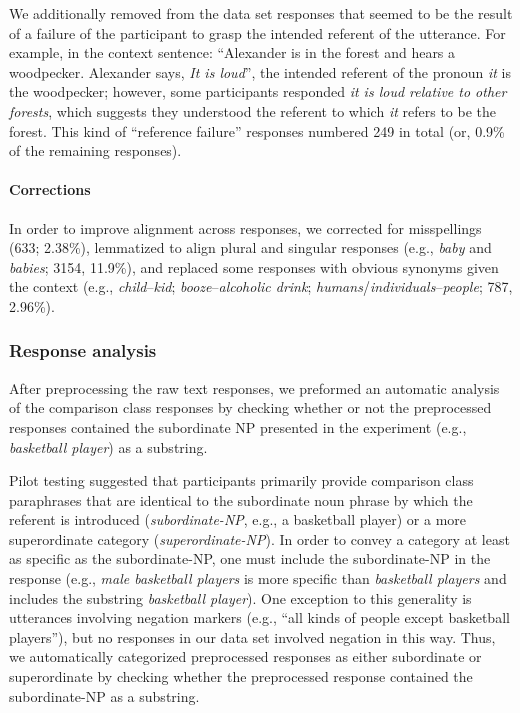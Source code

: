 \documentclass[doc]{apa6}
\begin{document}
We additionally removed from the data set responses that seemed to be the result of a failure of the participant to grasp the intended referent of the utterance. For example, in the context sentence: ``Alexander is in the forest and hears a woodpecker. Alexander says, \emph{It is loud}'', the intended referent of the pronoun \emph{it} is the woodpecker; however, some participants responded \emph{it is loud relative to other forests}, which suggests they understood the referent to which \emph{it} refers to be the forest. This kind of ``reference failure'' responses numbered 249 in total (or, 0.9\% of the remaining responses). 

\paragraph{Corrections}

In order to improve alignment across responses, we corrected for misspellings (633; 2.38\%), lemmatized to align plural and singular responses (e.g., \emph{baby} and \emph{babies}; 3154, 11.9\%), and replaced some responses with obvious synonyms given the context (e.g., \emph{child}--\emph{kid}; \emph{booze}--\emph{alcoholic drink}; \emph{humans}/\emph{individuals}--\emph{people}; 787, 2.96\%). 


\subsubsection{Response analysis}

After preprocessing the raw text responses, we preformed an automatic analysis of the comparison class responses by checking whether or not the preprocessed responses contained the subordinate NP presented in the experiment (e.g., \emph{basketball player}) as a substring. 

Pilot testing suggested that participants primarily provide comparison class paraphrases that are identical to the subordinate noun phrase by which the referent is introduced (\emph{subordinate-NP}, e.g., a basketball player) or a more superordinate category (\emph{superordinate-NP}). 
In order to convey a category at least as specific as the subordinate-NP, one must include the subordinate-NP in the response (e.g., \emph{male basketball players} is more specific than \emph{basketball players} and includes the substring \emph{basketball player}).
One exception to this generality is utterances involving negation markers (e.g., ``all kinds of people except basketball players''), but no responses in our data set involved negation in this way.
Thus, we automatically categorized preprocessed responses as either subordinate or superordinate by checking whether the preprocessed response contained the subordinate-NP as a substring.
\end{document}
